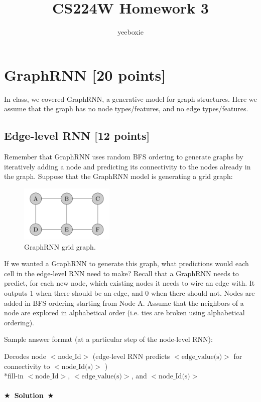\documentclass[11pt]{article}
\title{CS224W Homework 3}
\author{yeeboxie}
\newcommand{\Solution}[1]{{\medskip \color{red} \bf $\bigstar$~\sf \textbf{Solution}~$\bigstar$ \sf #1 } \bigskip}
\begin{document}
\maketitle
\section{GraphRNN [20 points]}

In class, we covered GraphRNN, a generative model for graph structures. Here we assume that the graph has no node types/features, and no edge types/features.

\subsection{Edge-level RNN [12 points]}
Remember that GraphRNN uses random BFS ordering to generate graphs by
iteratively adding a node and predicting its connectivity to the nodes already in the graph. Suppose that the GraphRNN model is generating a grid graph:
\begin{figure}[H]
    \centering
    \includegraphics[width=0.4\textwidth]{CS224W_Homework3/hw3-q1.jpg}
    \caption{GraphRNN grid graph.}
\end{figure}
If we wanted a GraphRNN to generate this graph, what predictions would each cell in the edge-level RNN need to make? Recall that a GraphRNN needs to predict, for each new node, which existing nodes it needs to wire an edge with. It outputs 1 when there should be an edge, and 0 when there should not. Nodes are added in BFS ordering starting from Node A. Assume that the neighbors of a node are explored in alphabetical order (i.e. ties are broken using alphabetical ordering).

\vspace{10pt}


\noindent Sample answer format (at a particular step of the node-level RNN):


Decodes node $<\text{node\_Id}>$ (edge-level RNN predicts $<\text{edge\_value(s)}>$ for connectivity to $<\text{node\_Id(s)}>$ )\\

*fill-in $<\text{node\_Id}>$, $<\text{edge\_value(s)}>$, and $<\text{node\_Id(s)}>$\\
\\
\Solution{}
\end{document}
